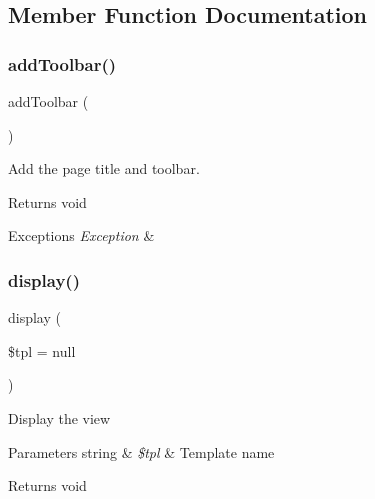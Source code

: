 \subsection{Member Function Documentation}
\mbox{\label{classtks__agenda_view_recuritem_af327e89538be614e923c7e5863319f43}} 
\subsubsection{add\+Toolbar()}
{\footnotesize\ttfamily add\+Toolbar (\begin{DoxyParamCaption}{ }\end{DoxyParamCaption})\hspace{0.3cm}{\ttfamily [protected]}}

Add the page title and toolbar.

\begin{DoxyReturn}{Returns}
void
\end{DoxyReturn}

\begin{DoxyExceptions}{Exceptions}
{\em Exception} & \\
\hline
\end{DoxyExceptions}
\mbox{\label{classtks__agenda_view_recuritem_aa988850da0dbeb9875debea0280754d5}} 
\subsubsection{display()}
{\footnotesize\ttfamily display (\begin{DoxyParamCaption}\item[{}]{\$tpl = {\ttfamily null} }\end{DoxyParamCaption})}

Display the view


\begin{DoxyParams}[1]{Parameters}
string & {\em \$tpl} & Template name\\
\hline
\end{DoxyParams}
\begin{DoxyReturn}{Returns}
void
\end{DoxyReturn}

